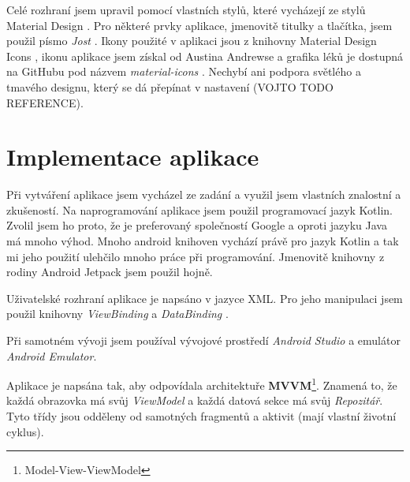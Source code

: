 \documentclass[a4paper,12pt]{report}
\begin{document}
Celé rozhraní jsem upravil pomocí vlastních stylů, které vycházejí ze stylů Material Design \cite{materialdesign}. Pro některé prvky aplikace, jmenovitě titulky a tlačítka, jsem použil písmo \emph{Jost} \cite{jost}. Ikony použité v aplikaci jsou z knihovny Material Design Icons \cite{icons}, ikonu aplikace jsem získal od Austina Andrewse \cite{pill-icon} a grafika léků je dostupná na GitHubu pod názvem \emph{material-icons} \cite{pills-icons}. Nechybí ani podpora světlého a tmavého designu, který se dá přepínat v nastavení (VOJTO TODO REFERENCE).

\chapter{Implementace aplikace}

Při vytváření aplikace jsem vycházel ze zadání a využil jsem vlastních znalostní a zkušeností. Na naprogramování aplikace jsem použil programovací jazyk Kotlin. Zvolil jsem ho proto, že je preferovaný společností Google a oproti jazyku Java má mnoho výhod. Mnoho android knihoven vychází právě pro jazyk Kotlin a tak mi jeho použití ulehčilo mnoho práce při programování. Jmenovitě knihovny z rodiny Android Jetpack \cite{jetpack} jsem použil hojně.

Uživatelské rozhraní aplikace je napsáno v jazyce XML. Pro jeho manipulaci jsem použil knihovny \emph{ViewBinding} \cite{viewbinding} a \emph{DataBinding} \cite{databinding}.

Při samotném vývoji jsem používal vývojové prostředí \emph{Android Studio} \cite{studio} a emulátor \emph{Android Emulator}.

Aplikace je napsána tak, aby odpovídala architektuře \textbf{MVVM}\footnote{Model-View-ViewModel}. Znamená to, že každá obrazovka má svůj \emph{ViewModel} a každá datová sekce má svůj \emph{Repozitář}. Tyto třídy jsou odděleny od samotných fragmentů a aktivit (mají vlastní životní cyklus).

\vspace{6pt}


\end{document}
